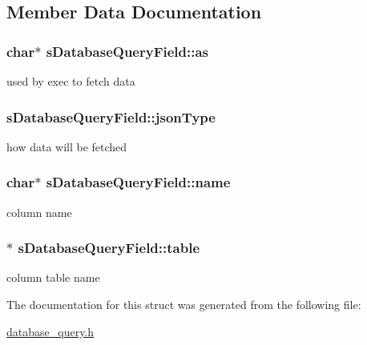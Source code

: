 \subsection{Member Data Documentation}
\subsubsection[{\texorpdfstring{as}{as}}]{\setlength{\rightskip}{0pt plus 5cm}char$\ast$ s\+Database\+Query\+Field\+::as}\hypertarget{structsDatabaseQueryField_a97d3648cdd9355173c5e1f2322050473}{}\label{structsDatabaseQueryField_a97d3648cdd9355173c5e1f2322050473}
used by exec to fetch data 
\subsubsection[{\texorpdfstring{json\+Type}{jsonType}}]{ s\+Database\+Query\+Field\+::json\+Type}\hypertarget{structsDatabaseQueryField_a6e0fe90cd89abdc82116cc61be5119d5}{}\label{structsDatabaseQueryField_a6e0fe90cd89abdc82116cc61be5119d5}
how data will be fetched 
\subsubsection[{\texorpdfstring{name}{name}}]{\setlength{\rightskip}{0pt plus 5cm}char$\ast$ s\+Database\+Query\+Field\+::name}\hypertarget{structsDatabaseQueryField_a89dd83131d90a8d8aeabfcafdde956b0}{}\label{structsDatabaseQueryField_a89dd83131d90a8d8aeabfcafdde956b0}
column name 
\subsubsection[{\texorpdfstring{table}{table}}]{$\ast$ s\+Database\+Query\+Field\+::table}\hypertarget{structsDatabaseQueryField_a32161fc1b757bde0390ae5f3ef50c7c4}{}\label{structsDatabaseQueryField_a32161fc1b757bde0390ae5f3ef50c7c4}
column table name 

The documentation for this struct was generated from the following file\+:\begin{DoxyCompactItemize}
\item 
\hyperlink{database__query_8h}{database\+\_\+query.\+h}\end{DoxyCompactItemize}
